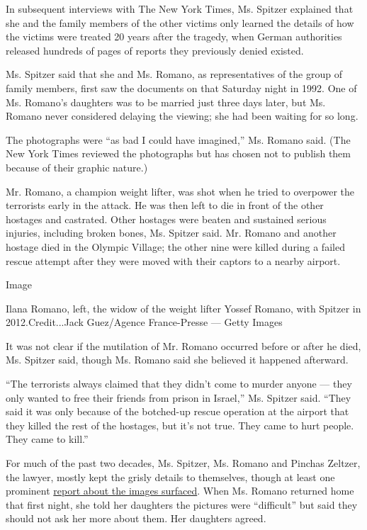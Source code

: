 In subsequent interviews with The New York Times, Ms. Spitzer explained
that she and the family members of the other victims only learned the
details of how the victims were treated 20 years after the tragedy, when
German authorities released hundreds of pages of reports they previously
denied existed.

Ms. Spitzer said that she and Ms. Romano, as representatives of the
group of family members, first saw the documents on that Saturday night
in 1992. One of Ms. Romano's daughters was to be married just three days
later, but Ms. Romano never considered delaying the viewing; she had
been waiting for so long.

The photographs were ``as bad I could have imagined,'' Ms. Romano said.
(The New York Times reviewed the photographs but has chosen not to
publish them because of their graphic nature.)

Mr. Romano, a champion weight lifter, was shot when he tried to
overpower the terrorists early in the attack. He was then left to die in
front of the other hostages and castrated. Other hostages were beaten
and sustained serious injuries, including broken bones, Ms. Spitzer
said. Mr. Romano and another hostage died in the Olympic Village; the
other nine were killed during a failed rescue attempt after they were
moved with their captors to a nearby airport.

Image

Ilana Romano, left, the widow of the weight lifter Yossef Romano, with
Spitzer in 2012.Credit...Jack Guez/Agence France-Presse --- Getty Images

It was not clear if the mutilation of Mr. Romano occurred before or
after he died, Ms. Spitzer said, though Ms. Romano said she believed it
happened afterward.

``The terrorists always claimed that they didn't come to murder anyone
--- they only wanted to free their friends from prison in Israel,'' Ms.
Spitzer said. ``They said it was only because of the botched-up rescue
operation at the airport that they killed the rest of the hostages, but
it's not true. They came to hurt people. They came to kill.''

For much of the past two decades, Ms. Spitzer, Ms. Romano and Pinchas
Zeltzer, the lawyer, mostly kept the grisly details to themselves,
though at least one prominent
\href{http://articles.latimes.com/2002/sep/05/sports/sp-munichmain05/4}{report
about the images surfaced}. When Ms. Romano returned home that first
night, she told her daughters the pictures were ``difficult'' but said
they should not ask her more about them. Her daughters agreed.

